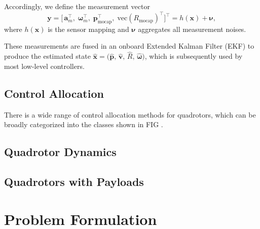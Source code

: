 Accordingly, we define the measurement vector
\[
  \bm y = \bigl[\,
    \bm a_m^\top,\;
    \bm \omega_m^\top,\;
    \bm p_{\text{mocap}}^\top,\;
    \mathrm{vec}(R_{\text{mocap}})^\top
  \bigr]^\top
  = h(\bm x) + \bm \nu,
\]
where $h(\bm x)$ is the sensor mapping and $\bm \nu$ aggregates all measurement noises.

These measurements are fused in an onboard Extended Kalman Filter (EKF) to produce the estimated state
\(
  \hat{\bm x} = \bigl(\hat{\bm p},\,\hat{\bm v},\,\hat R,\,\hat{\bm \omega}\bigr)
\),
which is subsequently used by most low-level controllers.



\subsection{Control Allocation}
There is a wide range of control allocation methods for quadrotors, which can be broadly categorized into the classes shown in FIG . 

\subsection{Quadrotor Dynamics}
\subsection{Quadrotors with Payloads}

\section{Problem Formulation}